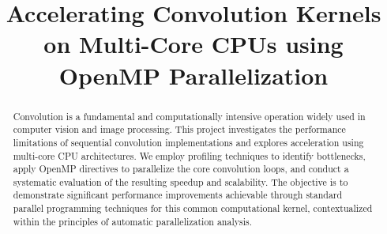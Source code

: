 \documentclass[conference, 10pt]{IEEEtran}
\begin{document}
\title{Accelerating Convolution Kernels on Multi-Core CPUs using OpenMP Parallelization}
\author{
\and
\and
\and
}


\maketitle 

\begin{abstract}
Convolution is a fundamental and computationally intensive operation widely used in computer vision and image processing. This project investigates the performance limitations of sequential convolution implementations and explores acceleration using multi-core CPU architectures. We employ profiling techniques to identify bottlenecks, apply OpenMP directives to parallelize the core convolution loops, and conduct a systematic evaluation of the resulting speedup and scalability. The objective is to demonstrate significant performance improvements achievable through standard parallel programming techniques for this common computational kernel, contextualized within the principles of automatic parallelization analysis.
\end{abstract}
\end{document}
